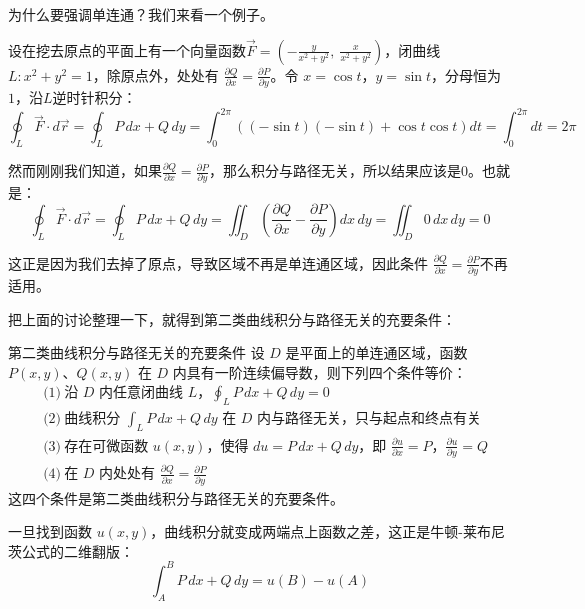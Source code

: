 为什么要强调单连通？我们来看一个例子。

设在挖去原点的平面上有一个向量函数\(\vec{F} = \left(-\frac{y}{x^2+y^2},\ \frac{x}{x^2+y^2}\right)\)，闭曲线 \(L:x^2+y^2=1\)，除原点外，处处有 \(\frac{\partial Q}{\partial x}=\frac{\partial P}{\partial y}\)。令 \(x=\cos t\)，\(y=\sin t\)，分母恒为 \(1\)，沿\(L\)逆时针积分：
\[
\oint_L \vec{F}\cdot d\vec{r} = \oint_L P\,dx+Q\,dy = \int_0^{2\pi} ((-\sin t)(-\sin t) + \cos t\cos t)dt = \int_0^{2\pi} dt = 2\pi
\]

然而刚刚我们知道，如果\(\frac{\partial Q}{\partial x}=\frac{\partial P}{\partial y}\)，那么积分与路径无关，所以结果应该是\(0\)。也就是：
\[
\oint_L \vec{F}\cdot d\vec{r} = \oint_L P\,dx+Q\,dy = \iint_D\left(\frac{\partial Q}{\partial x}-\frac{\partial P}{\partial y}\right)dx\,dy = \iint_D 0 \,dx\,dy = 0
\]

这正是因为我们去掉了原点，导致区域不再是单连通区域，因此条件 \(\frac{\partial Q}{\partial x}=\frac{\partial P}{\partial y}\)不再适用。

把上面的讨论整理一下，就得到第二类曲线积分与路径无关的充要条件：

\begin{theorem}{第二类曲线积分与路径无关的充要条件}{}
设 \(D\) 是平面上的单连通区域，函数 \(P(x,y)\)、\(Q(x,y)\) 在 \(D\) 内具有一阶连续偏导数，则下列四个条件等价：
\[
\begin{aligned}
&\text{(1)}\ \text{沿 }D\text{ 内任意闭曲线 }L\text{，}\oint_L P\,dx+Q\,dy = 0 \\[6pt]
&\text{(2)}\ \text{曲线积分 }\int_L P\,dx+Q\,dy\text{ 在 }D\text{ 内与路径无关，只与起点和终点有关} \\[6pt]
&\text{(3)}\ \text{存在可微函数 }u(x,y)\text{，使得 }du = P\,dx+Q\,dy\text{，即 }\frac{\partial u}{\partial x}=P\text{，}\frac{\partial u}{\partial y}=Q \\[6pt]
&\text{(4)}\ \text{在 }D\text{ 内处处有 }\frac{\partial Q}{\partial x} = \frac{\partial P}{\partial y}
\end{aligned}
\]
这四个条件是第二类曲线积分与路径无关的充要条件。
\end{theorem}

一旦找到函数 \(u(x,y)\)，曲线积分就变成两端点上函数之差，这正是牛顿-莱布尼茨公式的二维翻版：
\[
\int_A^B P\,dx + Q\,dy = u(B) - u(A)
\]

